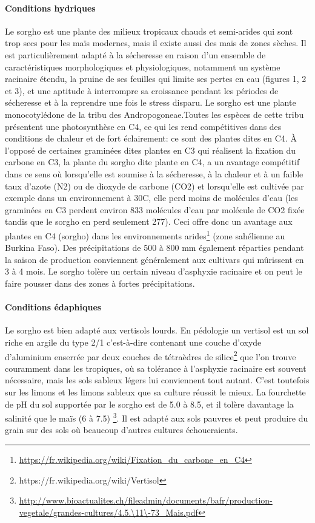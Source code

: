 \documentclass[a4paper,11pt]{article}
\begin{document}
\paragraph{Conditions hydriques} Le sorgho est une plante des milieux
tropicaux chauds et semi-arides qui sont trop secs pour les maïs
modernes, mais il existe aussi des maïs de zones sèches. Il est
particulièrement adapté à la sécheresse en raison d’un ensemble de
caractéristiques morphologiques et physiologiques, notamment un
système racinaire étendu, la pruine de ses feuilles qui limite ses
pertes en eau (figures 1, 2 et 3), et une aptitude à interrompre sa
croissance pendant les périodes de sécheresse et à la reprendre une
fois le stress disparu. Le sorgho est une plante monocotylédone de la
tribu des Andropogoneae.Toutes les espèces de cette tribu présentent une photosynthèse en C4, ce qui les rend compétitives dans des conditions de chaleur et de fort éclairement: ce sont des plantes dites en C4. À l’opposé de certaines graminées dites plantes en C3 qui réalisent la fixation du carbone en C3, la plante du sorgho dite plante en C4, a un avantage compétitif dans ce sens où lorsqu’elle est soumise à la sécheresse, à la chaleur et à un faible taux d’azote (N2) ou de dioxyde de carbone (CO2) et lorsqu’elle est cultivée par exemple dans un environnement à 30\degree{}C, elle perd moins de molécules d’eau (les graminées en C3 perdent environ 833 molécules d’eau par molécule de CO2 fixée tandis que le sorgho en perd seulement 277). Ceci offre donc un
avantage aux plantes en C4 (sorgho) dans les environnements
arides\footnote{\url{https://fr.wikipedia.org/wiki/Fixation_du_carbone_en_C4}}
(zone sahélienne au Burkina Faso). Des précipitations de 500 à 800 mm
également réparties pendant la saison de production conviennent
généralement aux cultivars qui mûrissent en 3 à 4 mois. Le sorgho
tolère un certain niveau d’asphyxie racinaire et on peut le faire
pousser dans des zones à fortes précipitations\cite{BARRO_KONDOMBO_2010}.

 
\paragraph{Conditions édaphiques}
Le sorgho est bien adapté aux vertisols lourds. En pédologie un vertisol
est un sol riche en argile du type 2/1
c’est-à-dire contenant une couche d’oxyde d’aluminium enserrée par deux couches de tétraèdres de
silice\footnote{https://fr.wikipedia.org/wiki/Vertisol} que l’on
trouve couramment dans les tropiques, où sa tolérance à l’asphyxie
racinaire est souvent nécessaire, mais les sols sableux légers lui
conviennent tout autant. C’est toutefois sur les limons et les limons
sableux que sa culture réussit le mieux. La fourchette de pH du sol
supportée par le sorgho est de 5.0 à 8.5, et il tolère davantage la
salinité que le maïs (6 à 7.5)
\footnote{\url{http://www.bioactualites.ch/fileadmin/documents/bafr/production-vegetale/grandes-cultures/4.5.\11\-73_Mais.pdf}}. Il est adapté aux sols pauvres et peut produire du grain sur des sols où beaucoup d’autres cultures échoueraients\cite{BARRO_KONDOMBO_2010}.
 
\end{document}
